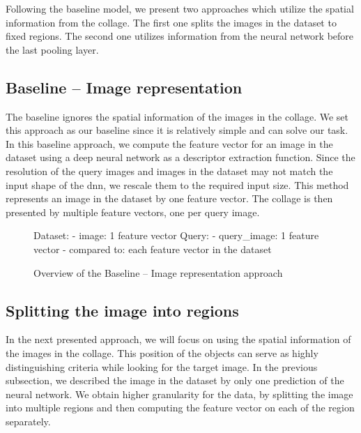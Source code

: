 Following the baseline model, we present two approaches which utilize the spatial information from the collage. The first one splits the images in the dataset to fixed regions. The second one utilizes information from the neural network before the last pooling layer.

\subsection{Baseline -- Image representation}

The baseline ignores the spatial information of the images in the collage. We set this approach as our baseline since it is relatively simple and can solve our task. In this baseline approach, we compute the feature vector for an image in the dataset using a deep neural network as a descriptor extraction function. Since the resolution of the query images and images in the dataset may not match the input shape of the \acrshort{dnn}, we rescale them to the required input size. This method represents an image in the dataset by one feature vector. The collage is then presented by multiple feature vectors, one per query image.


\begin{figure}
\centering
\begin{boxedverbatim}
Dataset:
    - image: 1 feature vector
Query:
    - query_image: 1 feature vector
    - compared to: each feature vector in the dataset
\end{boxedverbatim}
\caption{Overview of the Baseline -- Image representation approach}
\end{figure}

\subsection{Splitting the image into regions}

In the next presented approach, we will focus on using the spatial information of the images in the collage. This position of the objects can serve as highly distinguishing criteria while looking for the target image. In the previous subsection, we described the image in the dataset by only one prediction of the neural network. We obtain higher granularity for the data, by splitting the image into multiple regions and then computing the feature vector on each of the region separately.


